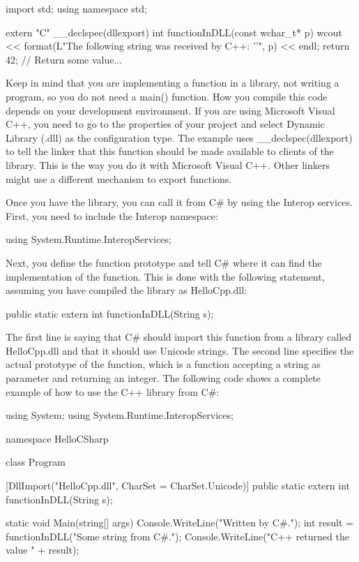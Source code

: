 \begin{cpp}
import std;
using namespace std;

extern "C"
{
    __declspec(dllexport) int functionInDLL(const wchar_t* p)
    {
        wcout << format(L"The following string was received by C++: '{}'", p)
        << endl;
        return 42; // Return some value...
    }
}
\end{cpp}

Keep in mind that you are implementing a function in a library, not writing a program, so you do not need a main() function. How you compile this code depends on your development environment. If you are using Microsoft Visual C++, you need to go to the properties of your project and select Dynamic Library (.dll) as the configuration type. The example uses \_\_declspec(dllexport) to tell the linker that this function should be made available to clients of the library. This is the way you do it with Microsoft Visual C++. Other linkers might use a different mechanism to export functions.

Once you have the library, you can call it from C\# by using the Interop services. First, you need to include the Interop namespace:

\begin{cpp}
using System.Runtime.InteropServices;
\end{cpp}

Next, you define the function prototype and tell C\# where it can find the implementation of the function. This is done with the following statement, assuming you have compiled the library as HelloCpp.dll:

\begin{cpp}
[DllImport("HelloCpp.dll", CharSet = CharSet.Unicode)] public static extern int functionInDLL(String s);
\end{cpp}

The first line is saying that C\# should import this function from a library called HelloCpp.dll and that it should use Unicode strings. The second line specifies the actual prototype of the function, which is a function accepting a string as parameter and returning an integer. The following code shows a complete example of how to use the C++ library from C\#:

\begin{cpp}
using System;
using System.Runtime.InteropServices;

namespace HelloCSharp
{
    class Program
    {
        [DllImport("HelloCpp.dll", CharSet = CharSet.Unicode)]
        public static extern int functionInDLL(String s);

        static void Main(string[] args)
        {
            Console.WriteLine("Written by C#.");
            int result = functionInDLL("Some string from C#.");
            Console.WriteLine("C++ returned the value " + result);
        }
    }
}
\end{cpp}

